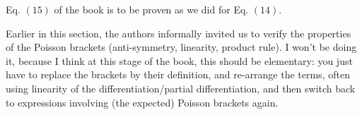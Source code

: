 \documentclass[solutions.tex]{subfiles}
\begin{document}
\begin{remark} Eq. $(15)$ of the book is to be proven as we did
for Eq. $(14)$.
\end{remark}

\begin{remark} Earlier in this section, the authors informally invited
us to verify the properties of the Poisson brackets (anti-symmetry, linearity,
product rule). I won't be doing it, because I think at this stage of the
book, this should be elementary: you just have to replace the brackets
by their definition, and re-arrange the terms, often using linearity of the
differentiation/partial differentiation, and then switch back to expressions
involving (the expected) Poisson brackets again. \\
\end{remark}
\end{document}
